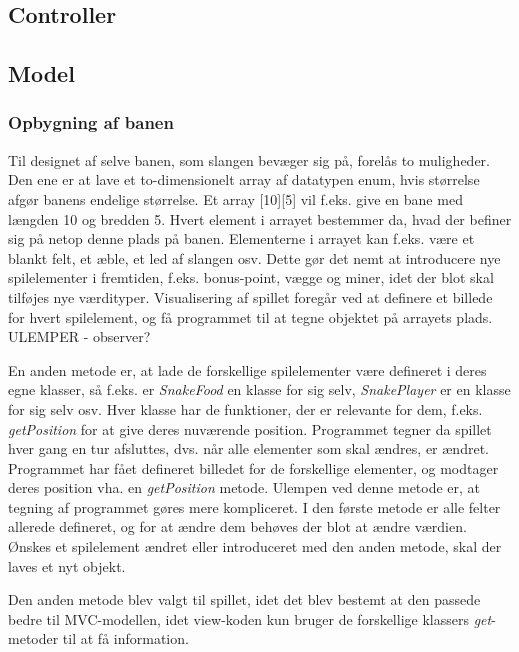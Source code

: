 \documentclass{report}
\begin{document}
\subsection{Controller}
	
\subsection{Model}

\subsubsection{Opbygning af banen}
Til designet af selve banen, som slangen bevæger sig på, forelås to muligheder. Den ene er at lave et to-dimensionelt array af datatypen enum, hvis størrelse afgør banens endelige størrelse. Et array [10][5] vil f.eks. give en bane med længden 10 og bredden 5. Hvert element i arrayet bestemmer da, hvad der befiner sig på netop denne plads på banen. Elementerne i arrayet kan f.eks. være et blankt felt, et æble, et led af slangen osv. Dette gør det nemt at introducere nye spilelementer i fremtiden, f.eks. bonus-point, vægge og miner, idet der blot skal tilføjes nye værdityper. Visualisering af spillet foregår ved at definere et billede for hvert spilelement, og få programmet til at tegne objektet på arrayets plads.
ULEMPER - observer?

En anden metode er, at lade de forskellige spilelementer være defineret i deres egne klasser, så f.eks. er \textit{SnakeFood} en klasse for sig selv, \textit{SnakePlayer} er en klasse for sig selv osv. Hver klasse har de funktioner, der er relevante for dem, f.eks. \textit{getPosition} for at give deres nuværende position. Programmet tegner da spillet hver gang en tur afsluttes, dvs. når alle elementer som skal ændres, er ændret. Programmet har fået defineret billedet for de forskellige elementer, og modtager deres position vha. en \textit{getPosition} metode.
 Ulempen ved denne metode er, at tegning af programmet gøres mere kompliceret. I den første metode er alle felter allerede defineret, og for at ændre dem behøves der blot at ændre værdien. Ønskes et spilelement ændret eller introduceret med den anden metode, skal der laves et nyt objekt.
 
Den anden metode blev valgt til spillet, idet det blev bestemt at den passede bedre til MVC-modellen, idet view-koden kun bruger de forskellige klassers \textit{get}-metoder til at få information. %
\end{document}
